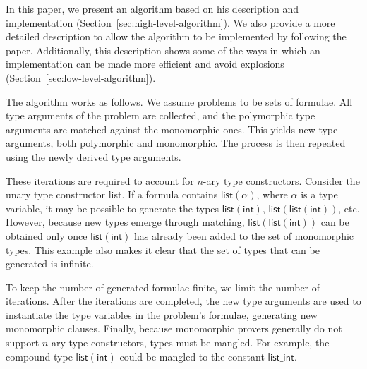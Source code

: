 \documentclass[]{ceurart}
\newcommand\ty[1]{\textsf{#1}}
\begin{document}
In this paper, we present an algorithm based on his description and implementation (Section~\ref{sec:high-level-algorithm}). We also provide a more detailed description to allow the algorithm to be implemented by following the paper. Additionally, this description shows some of the ways in which an implementation can be made more efficient and avoid explosions (Section~\ref{sec:low-level-algorithm}).


%


The algorithm works as follows. We assume problems to be sets of formulae. All type arguments of the problem are collected, and the polymorphic type arguments are matched against the monomorphic ones. This yields new type arguments, both polymorphic and monomorphic. The process is then repeated using the newly derived type arguments.

These iterations are required to account for $n$-ary type constructors. Consider the unary type constructor \ty{list}. If a formula contains $\ty{list}(\alpha)$, where $\alpha$ is a type variable, it may be possible to generate the types $\ty{list}(\ty{int})$, $\ty{list}(\ty{list}(\ty{int}))$, etc. However, because new types emerge through matching, $\ty{list}(\ty{list}(\ty{int}))$ can be obtained only once $\ty{list}(\ty{int})$ has already been added to the set of monomorphic types. This example also makes it clear that the set of types that can be generated is infinite.

To keep the number of generated formulae finite, we limit the number of iterations. After the iterations are completed, the new type arguments are used to instantiate the type variables in the problem's formulae, generating new monomorphic clauses. Finally, because monomorphic provers generally do not support $n$-ary type constructors, types must be mangled. For example, the compound type $\ty{list}(\ty{int})$ could be mangled to the constant $\ty{list\_int}$.
\end{document}
